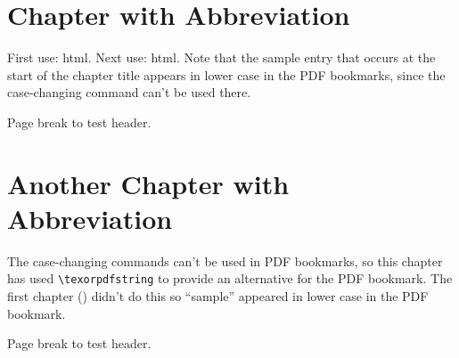 \documentclass{report}
\begin{document}
\begin{abstract}
This is a sample document that tests the use of entries
in sectioning commands through commands like \verb|\glsfmtshort|
and \verb|\glsfmttext|.
\end{abstract}

\tableofcontents

\chapter{ Chapter with  Abbreviation}
\label{ch:sample}

First use: \gls{html}. Next use: \gls{html}.
Note that the \gls{sample} entry that occurs at the start of
the chapter title appears in lower case in the PDF bookmarks, since
the case-changing command can't be used there.

\newpage

Page break to test header.

\chapter{Another 
  \texorpdfstring{}{Sample} 
  Chapter with  Abbreviation}

The case-changing commands can't be used in PDF bookmarks,
so this chapter has used \verb|\texorpdfstring| to provide
an alternative for the PDF bookmark. The first chapter
()
didn't do this so ``\Gls{sample}'' appeared in lower case in
the PDF bookmark.

\newpage

Page break to test header.

\printglossaries
\end{document}
